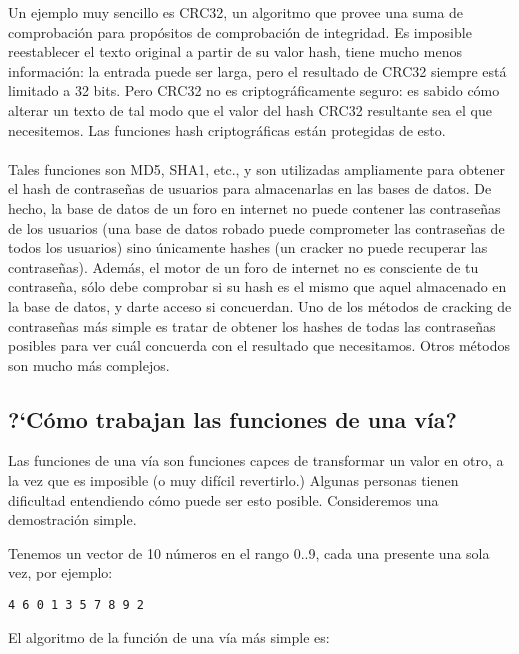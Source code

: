 \myindex{\HashFuncChapterName}
Un ejemplo muy sencillo es CRC32, un algoritmo que provee una  suma de
comprobaci\'on para prop\'ositos de comprobaci\'on de integridad.
Es imposible reestablecer el texto original a partir de su valor hash, tiene mucho menos informaci\'on:
la entrada puede ser larga, pero el resultado de CRC32 siempre est\'a limitado a 32 bits.
Pero CRC32 no es criptogr\'aficamente seguro: es sabido c\'omo alterar un texto de tal modo que el valor
del hash CRC32 resultante sea el que necesitemos.
Las funciones hash criptogr\'aficas est\'an protegidas de esto. \\
\\
Tales funciones son MD5, SHA1, etc., y son utilizadas ampliamente para obtener el hash de contrase\~nas de usuarios para
almacenarlas en las bases de datos.
De hecho, la base de datos de un foro en internet no puede contener las contrase\~nas de los usuarios
(una base de datos robado puede comprometer las contrase\~nas de todos los usuarios) sino \'unicamente
hashes (un cracker no puede recuperar las contrase\~nas).
Adem\'as, el motor de un foro de internet no es consciente de tu contrase\~na, s\'olo debe comprobar
si su hash es el mismo que aquel almacenado en la base de datos, y darte acceso si concuerdan.
Uno de los m\'etodos de cracking de contrase\~nas m\'as simple es tratar de obtener los hashes de todas
las contrase\~nas posibles para ver cu\'al concuerda con el resultado que necesitamos.
Otros m\'etodos son mucho m\'as complejos.

\subsection{?`C\'omo trabajan las funciones de una v\'ia?}

Las funciones de una v\'ia son funciones capces de transformar un valor en otro,
a la vez que es imposible (o muy dif\'icil revertirlo.)
Algunas personas tienen dificultad entendiendo c\'omo puede ser esto posible.
Consideremos una demostraci\'on simple.

Tenemos un vector de 10 n\'umeros en el rango 0..9, cada una presente una sola vez, por ejemplo:

\begin{lstlisting}
4 6 0 1 3 5 7 8 9 2
\end{lstlisting}

El algoritmo de la funci\'on de una v\'ia m\'as simple es:

